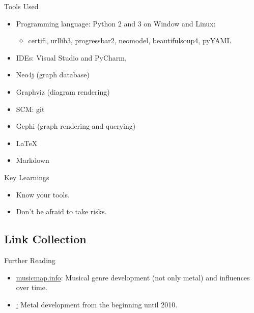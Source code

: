 \documentclass{beamer}
\begin{document}
    \begin{frame}{Tools Used}
      \begin{itemize}
        \item<1-> Programming language: Python 2 and 3 on Window and Linux:
          \begin{itemize}
            \item<1-> certifi, urllib3, progressbar2, neomodel, beautifulsoup4, pyYAML

          \end{itemize}
        \item<1-> IDEs: Visual Studio and PyCharm,
        \item<1-> Neo4j (graph database)
        \item<1-> Graphviz (diagram rendering)
        \item<1-> SCM: git
        \item<1-> Gephi (graph rendering and querying)
        \item<1-> \LaTeX{}
        \item<1-> Markdown
      \end{itemize}
    \end{frame}
    
    \begin{frame}{Key Learnings}
    
      \begin{itemize}
        \item<1-> Know your tools.
        \item<1-> Don't be afraid to take risks.
      \end{itemize}
      
    \end{frame}
    
  \subsection{Link Collection}

    \begin{frame}{Further Reading}
      \begin{itemize}
        \item\href{https://musicmap.info/}{musicmap.info}: Musical genre development
          (not only metal) and influences over time.
        \item\href{https://www.boundbymetal.com/en/common/metal-genres-graph/}: Metal
          development from the beginning until 2010.
      \end{itemize}
    \end{frame}
\end{document}

